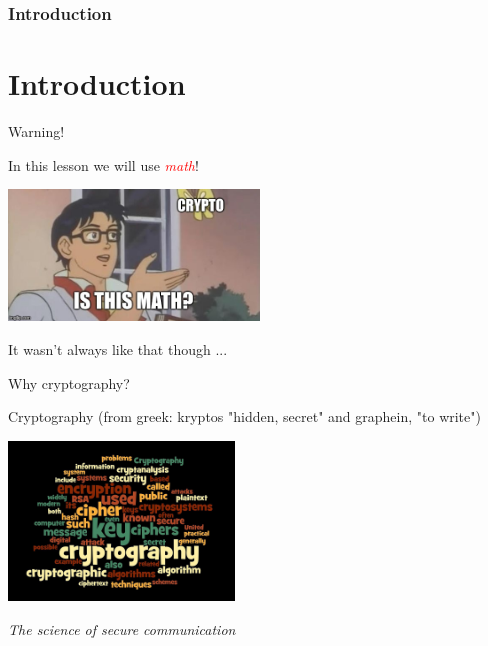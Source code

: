 \section[Section]{Introduction}
\part{Introduction}

\begin{frame}{Warning!}
  \centering

  In this lesson we will use \textcolor{red}{\textit{math}}! 
  
  \medskip

  \includegraphics[width=0.5\textwidth]{img/meme}

  \medskip
  
  It wasn't always like that though ...

\end{frame}

\begin{frame}{Why cryptography?}

\centering

Cryptography (from greek: kryptos "hidden, secret" and graphein, "to write")

\medskip

\includegraphics[width=0.45\textwidth]{img/crypto.jpg}

\medskip

\textit{The science of secure communication}

\end{frame}

